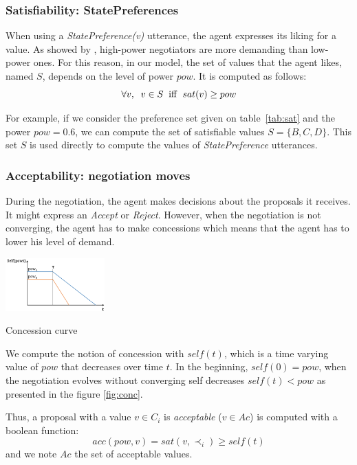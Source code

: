 \documentclass[conference, letterpaper]{IEEEtran}
\begin{document}
\subsubsection{Satisfiability: StatePreferences}
\label{sec:sat}
When using a \emph{StatePreference(v)} utterance, the agent expresses its liking for a value. As showed by \cite{de1995impact}, high-power negotiators are more demanding than low-power ones. For this reason, in our model, the set of values that the agent likes, named $S$, depends on the level of power $pow$. It is computed as follows:
\begin{equation}
\forall v,\hspace{2mm} v\in S\hspace{2mm}\mathrm{iff}\hspace{2mm}sat(v) \geq pow
\end{equation}

For example, if we consider the preference set given on table~\ref{tab:sat} and the power $pow=0.6$, we can compute the set of satisfiable values $S = \{B, C, D\}$. This set $S$ is used directly to compute the values of \emph{StatePreference} utterances.	

\subsubsection{Acceptability: negotiation moves}
During the negotiation, the agent makes decisions about the proposals it receives. It might express an \emph{Accept} or \emph{Reject}. However, when the negotiation is not converging, the agent has to make concessions which means that the agent has to lower his level of demand.

\begin{floatingfigure}[r]{1.5in}
	\includegraphics[width=1.5in]{figs/sv3.png}
	\caption{\label{fig:conc}Concession curve}
\end{floatingfigure} 

We compute the notion of concession with $self(t)$, which is a time varying value of $pow$ that decreases over time $t$. In the beginning, $self(0) = pow$, when the negotiation evolves without converging self decreases $self(t) < pow$ as presented in the figure \ref{fig:conc}.

Thus, a proposal with a value $v \in C_i$ is \emph{acceptable} ($v \in Ac$) is computed with a boolean function:
\begin{equation}
acc(pow, v) = sat(v, \prec_i) \geq self(t)
\end{equation}	
and we note $Ac$ the set of acceptable values.
\end{document}
